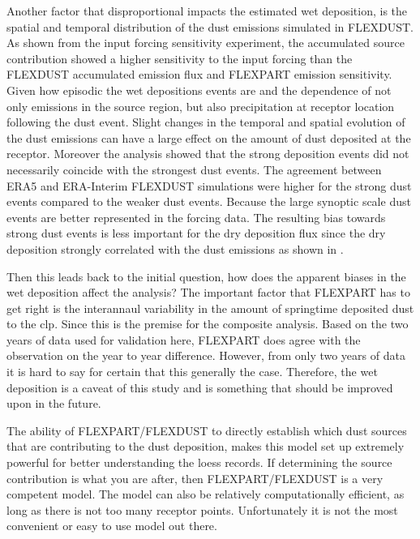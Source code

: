 Another factor that disproportional impacts the estimated wet deposition, is the spatial and temporal distribution of the dust emissions simulated in FLEXDUST. 
As shown from the input forcing sensitivity experiment, the accumulated source contribution showed a higher sensitivity to the input forcing than the FLEXDUST accumulated emission flux and FLEXPART emission sensitivity. Given how episodic the wet depositions events are and the dependence of not only emissions in the source region, but also precipitation at receptor location following the dust event. Slight changes in the temporal and spatial evolution of the dust emissions can have a large effect on the amount of dust deposited at the receptor. Moreover the analysis showed that the strong deposition events did not necessarily coincide with the strongest dust events. The agreement between ERA5 and ERA-Interim FLEXDUST simulations were higher for the strong dust events compared to the weaker dust events. Because the large synoptic scale dust events are better represented in the forcing data. The resulting bias towards strong dust events is less important for the dry deposition flux since the dry deposition strongly correlated with the dust emissions as shown in . 


Then this leads back to the initial question, how does the apparent biases in the wet deposition affect the analysis? 
The important factor that FLEXPART has to get right is the interannaul variability in the amount of springtime deposited dust to the \acrshort{clp}. 
Since this is the premise for the composite analysis. 
Based on the two years of data used for validation here, FLEXPART does agree with the observation on the year to year difference. 
However, from only two years of data it is hard to say for certain that this generally the case. 
Therefore, the wet deposition is a caveat of this study and is something that should be improved upon in the future. 

The ability of FLEXPART/FLEXDUST to directly establish which dust sources that are contributing to the dust deposition, makes this model set up extremely powerful for better understanding the loess records. If determining the source contribution is what you are after, then FLEXPART/FLEXDUST is a very competent model. The model can also be relatively computationally efficient, as long as there is not too many receptor points.
Unfortunately it is not the most convenient or easy to use model out there.   

